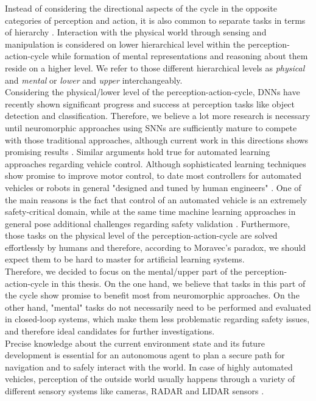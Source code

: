 Instead of considering the directional aspects of the cycle in the opposite categories of perception and action, it is also common to separate tasks in terms of hierarchy \cite{Loeb2014}.
Interaction with the physical world through sensing and manipulation is considered on lower hierarchical level within the perception-action-cycle while formation of mental representations and reasoning about them reside on a higher level.
We refer to those different hierarchical levels as \emph{physical} and \emph{mental} or \emph{lower} and \emph{upper} interchangeably.\\
Considering the physical/lower level of the perception-action-cycle, \acp{DNN} have recently shown significant progress and success at perception tasks like object detection and classification.
Therefore, we believe a lot more research is necessary until neuromorphic approaches using \acp{SNN} are sufficiently mature to compete with those traditional approaches, although current work in this directions shows promising results \cite{Hunsberger2015}.
Similar arguments hold true for automated learning approaches regarding vehicle control.
Although sophisticated learning techniques show promise to improve motor control, to date most controllers for automated vehicles or robots in general "designed and tuned by human engineers" \cite{Deisenroth2013}.
One of the main reasons is the fact that control of an automated vehicle is an extremely safety-critical domain, while at the same time machine learning approaches in general pose additional challenges regarding safety validation \cite{Koopman2016}.
Furthermore, those tasks on the physical level of the perception-action-cycle are solved effortlessly by humans and therefore, according to Moravec's paradox, we should expect them to be hard to master for artificial learning systems.\\
Therefore, we decided to focus on the mental/upper part of the perception-action-cycle in this thesis.
On the one hand, we believe that tasks in this part of the cycle show promise to benefit most from neuromorphic approaches.
On the other hand, "mental" tasks do not necessarily need to be performed and evaluated in closed-loop systems, which make them less problematic regarding safety issues, and therefore ideal candidates for further investigations.\\
Precise knowledge about the current environment state and its future development is essential for an autonomous agent to plan a secure path for navigation and to safely interact with the world.
In case of highly automated vehicles, perception of the outside world usually happens through a variety of different sensory systems like cameras, \acs{RADAR} and \acs{LIDAR} sensors \cite{Aeberhard2015}.
